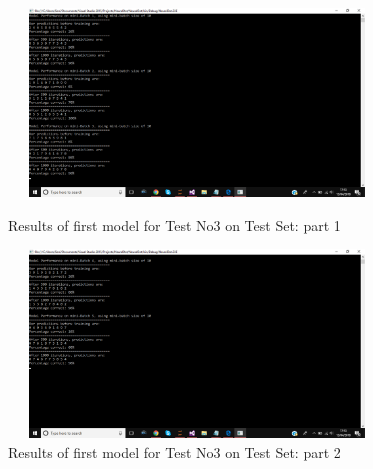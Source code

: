 \newpage

\begin{figure}[H]
    \centering

    \includegraphics[width=10cm, height=5cm]{Testing/MiniBatchResults/MiniBatchResults1-Test3.png}
    \caption{Results of first model for Test No3 on Test Set: part 1}
    \label{fig:TestNo3ResultsP1}
    
    \includegraphics[width=10cm, height=5cm]{Testing/MiniBatchResults/MiniBatchResults2-Test3.png}
    \caption{Results of first model for Test No3 on Test Set: part 2}
    \label{fig:TestNo3ResultsP2}
    
\end{figure}

